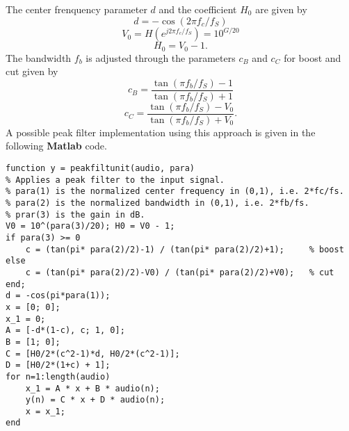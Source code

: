 \documentclass[10pt,a4paper,oneside]{article}
\begin{document}
The center frenquency parameter $d$ and the coefficient $H_0$ are given by
\[
d = -\cos(2\pi f_c/f_S)
\]
\[
V_0 = H(e^{j2\pi f_c/f_S}) = 10^{G/20}
\]
\[
H_0 = V_0 - 1.
\]
The bandwidth $f_b$ is adjusted through the parameters $c_B$ and $c_C$ for boost and cut given by
\[
c_B = \frac{\tan(\pi f_b/f_S) - 1}{\tan(\pi f_b/f_S) + 1}
\]
\[
c_C = \frac{\tan(\pi f_b/f_S) - V_0}{\tan(\pi f_b/f_S) + V_0}.
\]
A possible peak filter implementation using this approach is given in the following {\bfseries Matlab} code.
\begin{lstlisting}
function y = peakfiltunit(audio, para)
% Applies a peak filter to the input signal.
% para(1) is the normalized center frequency in (0,1), i.e. 2*fc/fs.
% para(2) is the normalized bandwidth in (0,1), i.e. 2*fb/fs.
% prar(3) is the gain in dB.
V0 = 10^(para(3)/20); H0 = V0 - 1;
if para(3) >= 0
	c = (tan(pi* para(2)/2)-1) / (tan(pi* para(2)/2)+1);     % boost
else
	c = (tan(pi* para(2)/2)-V0) / (tan(pi* para(2)/2)+V0);   % cut
end;
d = -cos(pi*para(1));
x = [0; 0];
x_1 = 0;
A = [-d*(1-c), c; 1, 0];
B = [1; 0];
C = [H0/2*(c^2-1)*d, H0/2*(c^2-1)];
D = [H0/2*(1+c) + 1];
for n=1:length(audio)
	x_1 = A * x + B * audio(n);
	y(n) = C * x + D * audio(n);
	x = x_1;
end
\end{lstlisting}
\end{document}
